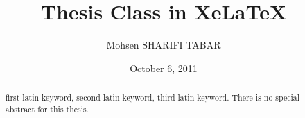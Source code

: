 \documentclass{article}
\begin{document}
\PrepareForLatinPages
\date{October 6, 2011}
\title{\sffamily Thesis Class in XeLaTeX}
\author{\sffamily Mohsen SHARIFI TABAR}
\subject{Pure Mathematics}
\begin{abstract}{first latin keyword, second latin keyword, third latin keyword.}
There is no special abstract for this thesis.
\end{abstract}
\makethesistitle
\ { }
\end{document}
